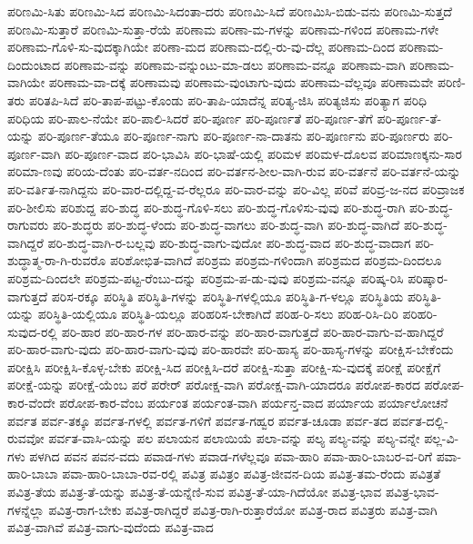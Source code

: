 {ಪರಿಣಮಿ-ಸಿತು
ಪರಿಣಮಿ-ಸಿದ
ಪರಿಣಮಿ-ಸಿದಂತಾ-ದರು
ಪರಿಣಮಿ-ಸಿದೆ
ಪರಿಣಮಿಸಿ-ಬಿಡು-ವನು
ಪರಿಣಮಿ-ಸುತ್ತದೆ
ಪರಿಣಮಿ-ಸುತ್ತಾರೆ
ಪರಿಣಮಿ-ಸುತ್ತಾ-ರೆಯೆ
ಪರಿಣಾಮ
ಪರಿಣಾ-ಮ-ಗಳನ್ನು
ಪರಿಣಾಮ-ಗಳಿಂದ
ಪರಿಣಾಮ-ಗಳೇ
ಪರಿಣಾಮ-ಗೊಳಿ-ಸು-ವುದಕ್ಕಾಗಿಯೇ
ಪರಿಣಾ-ಮದ
ಪರಿಣಾಮ-ದಲ್ಲಿ-ರು-ವು-ದೆಲ್ಲ
ಪರಿಣಾಮ-ದಿಂದ
ಪರಿಣಾಮ-ದಿಂದುಂಟಾದ
ಪರಿಣಾಮ-ವನ್ನು
ಪರಿಣಾಮ-ವನ್ನುಂಟು-ಮಾ-ಡಲು
ಪರಿಣಾಮ-ವನ್ನೂ
ಪರಿಣಾಮ-ವಾಗಿ
ಪರಿಣಾಮ-ವಾಗಿಯೇ
ಪರಿಣಾಮ-ವಾ-ದಕ್ಕೆ
ಪರಿಣಾಮವು
ಪರಿಣಾಮ-ವುಂಟಾಗು-ವುದು
ಪರಿಣಾಮ-ವೆಲ್ಲವೂ
ಪರಿಣಾಮವೇ
ಪರಿಣಿ-ತರು
ಪರಿತಪಿ-ಸಿದೆ
ಪರಿ-ತಾಪ-ಪಟ್ಟು-ಕೊಂಡು
ಪರಿ-ತಾಪಿ-ಯಾದೆನ್ನ
ಪರಿತ್ಯ-ಜಿಸಿ
ಪರಿತ್ಯಜಿಸು
ಪರಿತ್ಯಾಗ
ಪರಿಧಿ
ಪರಿಧಿಯ
ಪರಿ-ಪಾಲ-ನೆಯೇ
ಪರಿ-ಪಾಲಿ-ಸಿದರೆ
ಪರಿ-ಪೂರ್ಣ
ಪರಿ-ಪೂರ್ಣತೆ
ಪರಿ-ಪೂರ್ಣ-ತೆಗೆ
ಪರಿ-ಪೂರ್ಣ-ತೆ-ಯನ್ನು
ಪರಿ-ಪೂರ್ಣ-ತೆಯೂ
ಪರಿ-ಪೂರ್ಣ-ನಾಗು
ಪರಿ-ಪೂರ್ಣ-ನಾ-ದಾತನು
ಪರಿ-ಪೂರ್ಣನು
ಪರಿ-ಪೂರ್ಣರು
ಪರಿ-ಪೂರ್ಣ-ವಾಗಿ
ಪರಿ-ಪೂರ್ಣ-ವಾದ
ಪರಿ-ಭಾವಿಸಿ
ಪರಿ-ಭಾಷೆ-ಯಲ್ಲಿ
ಪರಿಮಳ
ಪರಿಮಳ-ದೊಲವ
ಪರಿಮಾಣಕ್ಕನು-ಸಾರ
ಪರಿಮಾ-ಣವು
ಪರಿಯ-ದೆಂತು
ಪರಿ-ವರ್ತ-ನದಿಂದ
ಪರಿ-ವರ್ತನ-ಶೀಲ-ವಾಗಿ-ರುವ
ಪರಿ-ವರ್ತನೆ
ಪರಿ-ವರ್ತನೆ-ಯನ್ನು
ಪರಿ-ವರ್ತಿತ-ನಾಗಿದ್ದನು
ಪರಿ-ವಾರ-ದಲ್ಲಿದ್ದ-ವ-ರೆಲ್ಲರೂ
ಪರಿ-ವಾರ-ವನ್ನು
ಪರಿ-ವಿಲ್ಲ
ಪರಿವೆ
ಪರಿವ್ರ-ಜ-ನದ
ಪರಿವ್ರಾಜಕ
ಪರಿ-ಶೀಲಿಸು
ಪರಿಶುದ್ದ
ಪರಿ-ಶುದ್ಧ
ಪರಿ-ಶುದ್ಧ-ಗೊಳಿ-ಸಲು
ಪರಿ-ಶುದ್ಧ-ಗೊಳಿಸು-ವುವು
ಪರಿ-ಶುದ್ಧ-ರಾಗಿ
ಪರಿ-ಶುದ್ಧ-ರಾಗುವರು
ಪರಿ-ಶುದ್ಧರು
ಪರಿ-ಶುದ್ಧ-ಳೆಂದು
ಪರಿ-ಶುದ್ಧ-ವಾಗಲು
ಪರಿ-ಶುದ್ಧ-ವಾಗಿ
ಪರಿ-ಶುದ್ಧ-ವಾಗಿದೆ
ಪರಿ-ಶುದ್ಧ-ವಾಗಿದ್ದರೆ
ಪರಿ-ಶುದ್ಧ-ವಾಗಿ-ರ-ಬಲ್ಲವು
ಪರಿ-ಶುದ್ಧ-ವಾಗು-ವುದೋ
ಪರಿ-ಶುದ್ಧ-ವಾದ
ಪರಿ-ಶುದ್ಧ-ವಾದಾಗ
ಪರಿ-ಶುದ್ಧಾತ್ಮ-ರಾ-ಗಿ-ರುವರೊ
ಪರಿಶೋಭಿತ-ವಾಗಿದೆ
ಪರಿಶ್ರಮ
ಪರಿಶ್ರಮ-ಗಳಿಂದಾಗಿ
ಪರಿಶ್ರಮದ
ಪರಿಶ್ರಮ-ದಿಂದಲೂ
ಪರಿಶ್ರಮ-ದಿಂದಲೇ
ಪರಿಶ್ರಮ-ಪಟ್ಟ-ರೆಂಬು-ದನ್ನು
ಪರಿಶ್ರಮ-ಪ-ಡು-ವುವು
ಪರಿಶ್ರಮ-ವನ್ನೂ
ಪರಿಷ್ಕ-ರಿಸಿ
ಪರಿಷ್ಕಾರ-ವಾಗುತ್ತದೆ
ಪರಿಸ-ರಕ್ಕೂ
ಪರಿಸ್ಥಿತಿ
ಪರಿಸ್ಥಿತಿ-ಗಳನ್ನು
ಪರಿಸ್ಥಿತಿ-ಗಳಲ್ಲಿಯೂ
ಪರಿಸ್ಥಿತಿ-ಗ-ಳಲ್ಲೂ
ಪರಿಸ್ಥಿತಿಯ
ಪರಿಸ್ಥಿತಿ-ಯನ್ನು
ಪರಿಸ್ಥಿತಿ-ಯಲ್ಲಿಯೂ
ಪರಿಸ್ಥಿತಿ-ಯಲ್ಲೂ
ಪರಿಹರಿಸ-ಬೇಕಾಗಿದೆ
ಪರಿಹ-ರಿ-ಸಲು
ಪರಿಹ-ರಿಸಿ-ದಿರಿ
ಪರಿಹರಿ-ಸುವುದ-ರಲ್ಲಿ
ಪರಿ-ಹಾರ
ಪರಿ-ಹಾರ-ಗಳ
ಪರಿ-ಹಾರ-ವನ್ನು
ಪರಿ-ಹಾರ-ವಾಗುತ್ತದೆ
ಪರಿ-ಹಾರ-ವಾಗು-ವ-ಹಾಗಿದ್ದರೆ
ಪರಿ-ಹಾರ-ವಾಗು-ವುದು
ಪರಿ-ಹಾರ-ವಾಗು-ವುವು
ಪರಿ-ಹಾರವೇ
ಪರಿ-ಹಾಸ್ಯ
ಪರಿ-ಹಾಸ್ಯ-ಗಳನ್ನು
ಪರೀಕ್ಷಿಸ-ಬೇಕೆಂದು
ಪರೀಕ್ಷಿಸಿ
ಪರೀಕ್ಷಿಸಿ-ಕೊಳ್ಳ-ಬೇಕು
ಪರೀಕ್ಷಿ-ಸಿದ
ಪರೀಕ್ಷಿಸಿ-ದರೆ
ಪರೀಕ್ಷಿ-ಸುತ್ತಾ
ಪರೀಕ್ಷಿ-ಸು-ವುದಕ್ಕೆ
ಪರೀಕ್ಷೆ
ಪರೀಕ್ಷೆಗೆ
ಪರೀಕ್ಷೆ-ಯನ್ನು
ಪರೀಕ್ಷೆ-ಯೆಂಬ
ಪರೆ
ಪರೇರ್
ಪರೋಕ್ಷ-ವಾಗಿ
ಪರೋಕ್ಷ-ವಾಗಿ-ಯಾದರೂ
ಪರೋಪ-ಕಾರದ
ಪರೋಪ-ಕಾರ-ವೆಂದೇ
ಪರೋಪ-ಕಾರ-ವೆಂಬ
ಪರ್ಯಂತ
ಪರ್ಯಂತ-ವಾಗಿ
ಪರ್ಯನ್ತ-ವಾದ
ಪರ್ಯಾಯ
ಪರ್ಯಾಲೋಚನೆ
ಪರ್ವತ
ಪರ್ವ-ತಕ್ಕೂ
ಪರ್ವತ-ಗಳಲ್ಲಿ
ಪರ್ವತ-ಗಳಿಗೆ
ಪರ್ವತ-ಗಹ್ವರ
ಪರ್ವತ-ಚೂಡಾ
ಪರ್ವ-ತದ
ಪರ್ವತ-ದಲ್ಲಿ-ರುವವೋ
ಪರ್ವತ-ವಾಸಿ-ಯನ್ನು
ಪಲ
ಪಲಾಯನ
ಪಲಾಯಿಯೆ
ಪಲಾ-ವನ್ನು
ಪಲ್ಯ
ಪಲ್ಯ-ವನ್ನು
ಪಲ್ಯ-ವನ್ನೇ
ಪಲ್ಲ-ವಿ-ಗಳು
ಪಳಗಿದ
ಪವನ
ಪವನ-ವದು
ಪವಾಡ-ಗಳು
ಪವಾಡ-ಗಳೆಲ್ಲವೂ
ಪವಾ-ಹಾರಿ
ಪವಾ-ಹಾರಿ-ಬಾಬರ-ವ-ರಿಗೆ
ಪವಾ-ಹಾರಿ-ಬಾಬಾ
ಪವಾ-ಹಾರಿ-ಬಾಬಾ-ರವ-ರಲ್ಲಿ
ಪವಿತ್ರ
ಪವಿತ್ರಂ
ಪವಿತ್ರ-ಜೀವನ-ದಿಯ
ಪವಿತ್ರ-ತಮ-ರೆಂದು
ಪವಿತ್ರತೆ
ಪವಿತ್ರ-ತೆಯ
ಪವಿತ್ರ-ತೆ-ಯನ್ನು
ಪವಿತ್ರ-ತೆ-ಯನ್ನೆಣಿ-ಸುವ
ಪವಿತ್ರ-ತೆ-ಯಾ-ಗಿದೆಯೋ
ಪವಿತ್ರ-ಭಾವ
ಪವಿತ್ರ-ಭಾವ-ಗಳನ್ನೆಲ್ಲಾ
ಪವಿತ್ರ-ರಾಗ-ಬೇಕು
ಪವಿತ್ರ-ರಾಗಿದ್ದರೆ
ಪವಿತ್ರ-ರಾಗಿ-ರುತ್ತಾರೆಯೋ
ಪವಿತ್ರ-ರಾದ
ಪವಿತ್ರರು
ಪವಿತ್ರ-ವಾಗಿ
ಪವಿತ್ರ-ವಾಗಿವೆ
ಪವಿತ್ರ-ವಾಗು-ವುದೆಂದು
ಪವಿತ್ರ-ವಾದ
}
